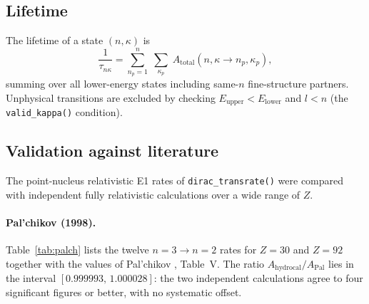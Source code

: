 \documentclass[11pt,a4paper]{article}
\begin{document}
\subsection{Lifetime}

The lifetime of a state $(n,\kappa)$ is
\[
\frac{1}{\tau_{n\kappa}} =
\sum_{n_{p}=1}^{n}\;
\sum_{\kappa_{p}}\;
A_{\text{total}}(n,\kappa\to n_{p},\kappa_{p}),
\]
summing over all lower-energy states including same-$n$ fine-structure
partners.  Unphysical transitions are excluded by checking
$E_{\text{upper}} < E_{\text{lower}}$ and $l < n$ (the {\tt valid\_kappa()}
condition).

\subsection{Validation against literature}
\label{sec:validation}

The point-nucleus relativistic E1 rates of {\tt dirac\_transrate()} were
compared with independent fully relativistic calculations over a wide
range of $Z$.

\paragraph{Pal'chikov (1998).}
Table~\ref{tab:palch} lists the twelve $n=3\to n=2$ rates for $Z=30$ and
$Z=92$ together with the values of Pal'chikov \cite{Palchikov1998}, Table~V.  The ratio
$A_{\text{hydrocal}}/A_{\text{Pal}}$ lies in the interval
$[0.999993,\,1.000028]$: the two independent calculations agree to four
significant figures or better, with no systematic offset.
\end{document}
